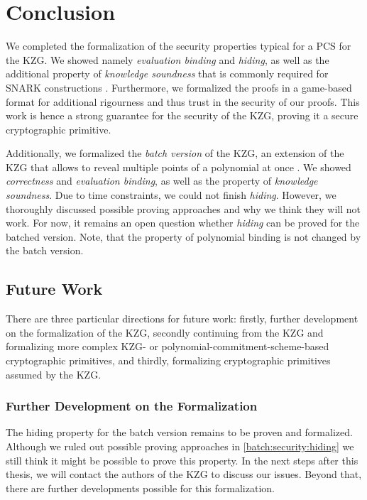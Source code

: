 \chapter{Conclusion}\label{chapter:conclusion}
We completed the formalization of the security properties typical for a PCS for the KZG. We showed namely \textit{evaluation binding} and \textit{hiding}, as well as the additional property of \textit{knowledge soundness} that is commonly required for SNARK constructions \parencite{thalerbook,plonk,sonic,halo}. Furthermore, we formalized the proofs in a game-based format for additional rigourness and thus trust in the security of our proofs.
This work is hence a strong guarantee for the security of the KZG, proving it a secure cryptographic primitive.

Additionally, we formalized the \textit{batch version} of the KZG, an extension of the KZG that allows to reveal multiple points of a polynomial at once \parencite{KZG}.  We showed \textit{correctness} and \textit{evaluation binding}, as well as the property of \textit{knowledge soundness}. Due to time constraints, we could not finish \textit{hiding}. However, we thoroughly discussed possible proving approaches and why we think they will not work. For now, it remains an open question whether \textit{hiding} can be proved for the batched version. Note, that the property of polynomial binding is not changed by the batch version. 

\section*{Future Work}
There are three particular directions for future work: firstly, further development on the formalization of the KZG, secondly continuing from the KZG and formalizing more complex KZG- or polynomial-commitment-scheme-based cryptographic primitives, and thirdly, formalizing cryptographic primitives assumed by the KZG.

\subsection*{Further Development on the Formalization}

The hiding property for the batch version remains to be proven and formalized. Although we ruled out possible proving approaches in \ref*{batch:security:hiding} we still think it might be possible to prove this property. In the next steps after this thesis, we will contact the authors of the KZG to discuss our issues.
Beyond that, there are further developments possible for this formalization. 

